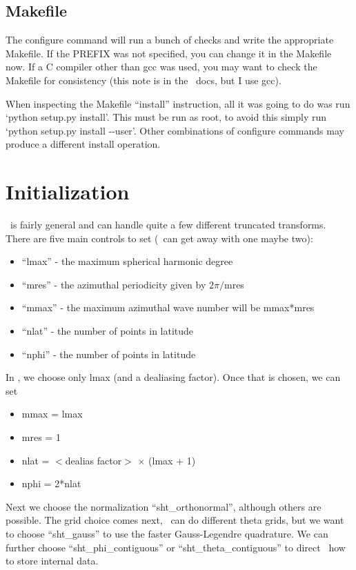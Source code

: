 \documentclass[10pt,letterpaper]{article}
\begin{document}
\subsection{Makefile}
The configure command will run a bunch of checks and write the appropriate Makefile.
If the PREFIX was not specified, you can change it in the Makefile now. If a C compiler
other than gcc was used, you may want to check the Makefile for consistency (this note
is in the \shtns\ docs, but I use gcc).

When inspecting the Makefile ``install'' instruction, all it was going to do was run
`python setup.py install'. This must be run as root, to avoid this simply run
`python setup.py install -{}-user'. Other combinations of configure commands may
produce a different install operation.

\section{Initialization}
\shtns\ is fairly general and can handle quite a few different truncated transforms.
There are five main controls to set (\rayleigh\ can get away with one maybe two):
\begin{itemize}
 \item ``lmax'' - the maximum spherical harmonic degree
 \item ``mres'' - the azimuthal periodicity given by $2\pi/$mres
 \item ``mmax'' - the maximum azimuthal wave number will be mmax*mres
 \item ``nlat'' - the number of points in latitude
 \item ``nphi'' - the number of points in latitude
\end{itemize}
In \rayleigh, we choose only lmax (and a dealiasing factor). Once that is chosen, we can
set
\begin{itemize}
 \item mmax = lmax
 \item mres = 1
 \item nlat = $<$dealias factor$>$ $\times$ (lmax + 1)
 \item nphi = 2*nlat
\end{itemize}
Next we choose the normalization ``sht\_orthonormal'', although others are possible.
The grid choice comes next, \shtns\ can do different theta grids, but we
want to choose ``sht\_gauss'' to use the faster Gauss-Legendre quadrature.
We can further choose ``sht\_phi\_contiguous'' or ``sht\_theta\_contiguous'' to
direct \shtns\ how to store internal data.
\end{document}

